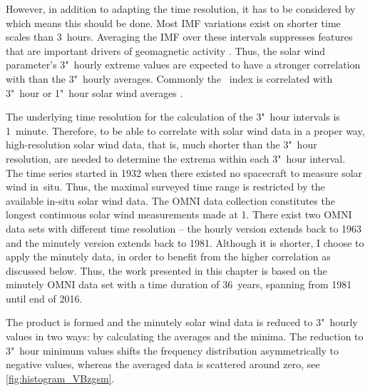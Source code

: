 However, in addition to adapting the time resolution, it has to be considered by which means this should be done. Most IMF variations exist on shorter time scales than 3~hours. Averaging the IMF over these intervals suppresses features that are important drivers of geomagnetic activity \citep{Savani2017}. Thus, the solar wind parameter's 3"~hourly extreme values are expected to have a stronger correlation with \Kp{} than the 3"~hourly averages.
Commonly the \Kp~index is correlated with 3"~hour or 1"~hour solar wind averages \citep[e.g., ][]{Newell2007,Elliott2013,Savani2017}.

The underlying time resolution for the calculation of the 3"~hour \Kp{} intervals is 1~minute. Therefore, to be able to correlate \Kp{} with solar wind data in a proper way, high-resolution solar wind data, that is, much shorter than the 3"~hour resolution, are needed to determine the extrema within each 3"~hour interval.
The \Kp{} time series started in 1932 when there existed no spacecraft to measure solar wind in~situ. Thus, the maximal surveyed time range is restricted by the available in-situ solar wind data.
The OMNI data collection constitutes the longest continuous solar wind measurements made at \SI{1}{\au}. There exist two OMNI data sets with different time resolution -- the hourly version extends back to 1963 and the minutely version extends back to 1981. Although it is shorter, I choose to apply the minutely data, in order to benefit from the higher correlation as discussed below. Thus, the work presented in this chapter is based on the minutely OMNI data set with a time duration of 36~years, spanning from 1981 until end of 2016.

The product \vBz{} is formed and the minutely solar wind data is reduced to 3"~hourly values in two ways: by calculating the averages and the minima.
The reduction to 3"~hour minimum values shifts the \vBz{} frequency distribution asymmetrically to negative values, whereas the averaged data is scattered around zero, see \autoref{fig:histogram_VBzgsm}.


